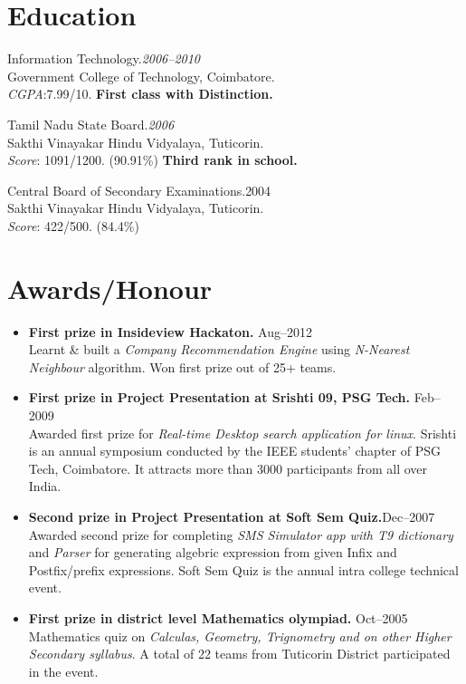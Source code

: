 \documentclass{cv}
\begin{document}
 

\section{Education}
\begin{description}[leftmargin=55pt,labelwidth=50pt]
  \item[B.Tech] Information Technology.\hfill\textit{2006--2010}
    \\Government College of Technology, Coimbatore.
    \\\textit{CGPA}:7.99/10.  \textbf{First class with Distinction.}
  \item[HSC] Tamil Nadu State Board.\hfill\textit{2006}
    \\Sakthi Vinayakar Hindu Vidyalaya, Tuticorin.
    \\\textit{Score}: 1091/1200. (90.91\%) \textbf{Third rank in school.}
  \item[AISSE] Central Board of Secondary Examinations.\hfill{2004}
    \\Sakthi Vinayakar Hindu Vidyalaya, Tuticorin.
    \\\textit{Score}: 422/500. (84.4\%)
\end{description}
 
\section{Awards/Honour}
\begin{itemize}[label={$\ast$}]
  \item \textbf{First prize in Insideview Hackaton.} \hfill Aug--2012\\
    Learnt \& built a \textit{Company Recommendation Engine} using \textit{N-Nearest Neighbour} algorithm.  Won first prize out of 25+ teams.
  \item \textbf{First prize in Project Presentation at Srishti 09, PSG Tech.} \hfill Feb--2009\\
    Awarded first prize for \textit{Real-time Desktop search application for linux}. Srishti is an annual symposium conducted by the IEEE students' chapter of PSG Tech, Coimbatore.  It attracts more than 3000 participants from all over India.
  \item \textbf{Second prize in Project Presentation at Soft Sem Quiz.}\hfill Dec--2007\\
    Awarded second prize for completing \textit{SMS Simulator app with T9 dictionary} and \textit{Parser} for generating algebric expression from given Infix and Postfix/prefix expressions.  Soft Sem Quiz is the annual intra college technical event.
  \item \textbf{First prize in district level Mathematics olympiad.} \hfill Oct--2005\\
    Mathematics quiz on \textit{Calculas, Geometry, Trignometry and on other Higher Secondary syllabus}.  A total of 22 teams from Tuticorin District participated in the event.
\end{itemize}
\end{document}
